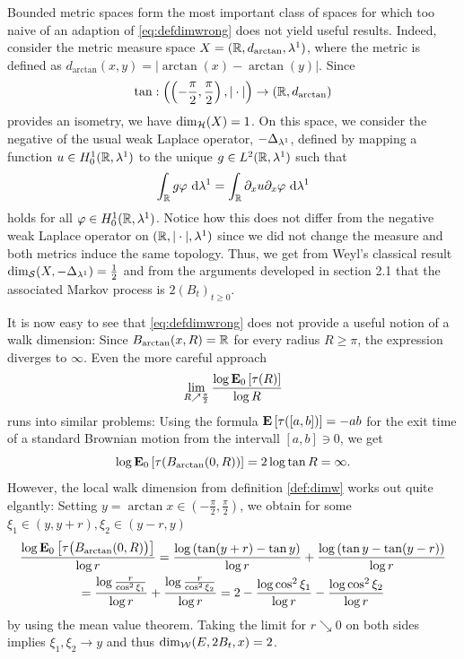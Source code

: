 Bounded metric spaces form the most important class of spaces for which too naive of an adaption of \eqref{eq:defdimwrong} does not yield useful results. Indeed, consider the metric measure space 
$X=(\IR,d_{\arctan},\gl^1)$, where the metric is defined as $d_{\arctan}(x,y)=|\arctan(x)-\arctan(y)|$. Since 
\[
  \tan:\left(\left(-\frac{\pi}{2},\frac{\pi}{2}\right),|\cdot|\right)\to(\IR,d_{\arctan}) 
\]
provides an isometry, we have $\dimh(X)=1$. On this space, we consider the negative of the usual weak Laplace operator, $-\gD_{\gl^1}$, defined by mapping a function $u\in H_0^1(\IR,\gl^1)$ to the unique $g\in L^2(\IR,\gl^1)$ such that
\[
  \int_\IR g\gp\,\Di\gl^1=\int_\IR \partial_x u\partial_x \gp\,\Di\gl^1
\]
holds for all $\gp\in H_0^1(\IR,\gl^1)$. Notice how this does not differ from the negative weak Laplace operator on $(\IR,|\cdot|,\gl^1)$ since we did not change the measure and both metrics induce the same topology. Thus, we get from Weyl's classical result $\dims(X,-\gD_{\gl^1})=\frac{1}{2}$ and from the arguments developed in section 2.1 that the associated Markov process is $2(B_t)_{t\geq0}$. 

It is now easy to see that \eqref{eq:defdimwrong} does not provide a useful notion of a walk dimension: Since $B_{\arctan}(x,R)=\IR$ for every radius $R\geq\pi$, the expression diverges to $\infty$. Even the more careful approach 
\[
  \lim_{R\nearrow\frac{\pi}{2}}\frac{\log \PTEp{\tau(R)}{0}}{\log R}
\]
runs into similar problems: Using the formula $\PTE{\tau([a,b])}=-ab$ for the exit time of a standard Brownian motion from the intervall $[a,b]\ni 0$, we get
\[
  \log \PTEp{\tau(B_{\arctan}(0,R))}{0}=2\log \tan R =\infty.
\]
However, the local walk dimension from definition \ref{def:dimw} works out quite elgantly: Setting $y=\arctan x\in\left(-\frac{\pi}{2},\frac{\pi}{2}\right)$, we obtain for some $\xi_1\in (y,y+r),\xi_2\in(y-r,y)$
\begin{multline*}
  \frac{\log \PTEp{\tau\big(B_{\arctan}(0,R)\big)}{0}}{\log r}
  =\frac{\log\left(\tan(y+r)-\tan y\right)}{\log r}+\frac{\log\left(\tan y-\tan (y-r)\right)}{\log r}\\
  =\frac{\log\frac{r}{\cos^2 \xi_1}}{\log r}+\frac{\log\frac{r}{\cos^2 \xi_2}}{\log r}
  =2-\frac{\log \cos^2 \xi_1}{\log r}-\frac{\log\cos^2 \xi_2}{\log r}
\end{multline*}
by using the mean value theorem. Taking the limit for $r\searrow0$ on both sides implies $\xi_1,\xi_2\to y$ and thus $\dimw(E,2B_t,x)=2$. 







